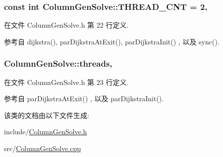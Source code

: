 \subsubsection[{\texorpdfstring{T\+H\+R\+E\+A\+D\+\_\+\+C\+NT}{THREAD_CNT}}]{\setlength{\rightskip}{0pt plus 5cm}const int Column\+Gen\+Solve\+::\+T\+H\+R\+E\+A\+D\+\_\+\+C\+NT = 2\hspace{0.3cm}{\ttfamily [static]}, {\ttfamily [protected]}}\hypertarget{classColumnGenSolve_a6ead284bdba22a11e3b84eb873807e23}{}\label{classColumnGenSolve_a6ead284bdba22a11e3b84eb873807e23}


在文件 Column\+Gen\+Solve.\+h 第 22 行定义.



参考自 dijkstra(), par\+Dijkstra\+At\+Exit(), par\+Dijkstra\+Init() , 以及 sync().

\subsubsection[{\texorpdfstring{threads}{threads}}]{ Column\+Gen\+Solve\+::threads\hspace{0.3cm}{\ttfamily [static]}, {\ttfamily [protected]}}\hypertarget{classColumnGenSolve_ae836bca68776f265a26e46c7e842492e}{}\label{classColumnGenSolve_ae836bca68776f265a26e46c7e842492e}


在文件 Column\+Gen\+Solve.\+h 第 23 行定义.



参考自 par\+Dijkstra\+At\+Exit() , 以及 par\+Dijkstra\+Init().



该类的文档由以下文件生成\+:\begin{DoxyCompactItemize}
\item 
include/\hyperlink{ColumnGenSolve_8h}{Column\+Gen\+Solve.\+h}\item 
src/\hyperlink{ColumnGenSolve_8cpp}{Column\+Gen\+Solve.\+cpp}\end{DoxyCompactItemize}
